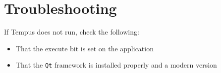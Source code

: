 \section{Troubleshooting}

If Tempus does not run, check the following:
\begin{itemize}
    \item That the execute bit is set on the application
    \item That the \texttt{Qt} framework is installed properly and a modern version
\end{itemize}
